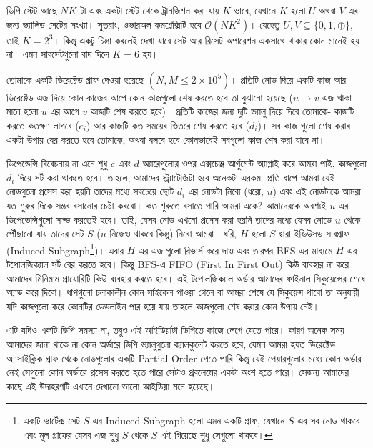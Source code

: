 \begin{solution}
ডিপি স্টেট আছে $NK$ টা এবং একটা স্টেট থেকে ট্রানজিশন করা যায় $K$ ভাবে, যেখানে $K$ হলো $U$ অথবা $V$ এর জন্য ভ্যালিড সেটের সংখ্যা। সুতরাং, ওভারঅল কমপ্লেক্সিটি হবে $\mathcal{O}(NK^2)$। যেহেতু $U, V \subseteq \{0, 1, \oplus\}$, তাই $K = 2^3$। কিন্তু একটু চিন্তা করলেই দেখা যাবে সেট আর রিসেট অপারেশন একসাথে থাকার কোন মানেই হয় না। এমন সাবসেটগুলো বাদ দিলে $K=6$ হয়।
\end{solution}

\begin{example}
তোমাকে একটি ডিরেক্টেড গ্রাফ দেওয়া হয়েছে $(N, M \le 2\times 10^5)$। প্রতিটি নোড দিয়ে একটি কাজ আর ডিরেক্টেড এজ দিয়ে কোন কাজের আগে কোন কাজগুলো শেষ করতে হবে তা বুঝানো হয়েছে ($u \rightarrow v$ এজ থাকা মানে হলো $u$ এর আগে $v$ কাজটি শেষ করতে হবে)। প্রতিটি কাজের জন্য দুটি ভ্যালু দিয়ে দিবে তোমাকে- কাজটি করতে কতক্ষণ লাগবে ($c_i$) আর কাজটি কত সময়ের ভিতরে শেষ করতে হবে ($d_i$)। সব কাজ গুলো শেষ করার একটা উপায় বের করতে হবে তোমাকে, অথবা বলবে হবে কোনভাবেই সবগুলো কাজ শেষ করা যাবে না।
\end{example}
\begin{solution}
ডিপেন্ডেন্সি বিবেচনায় না এনে শুধু $c$ এবং $d$ অ্যারেগুলোর ওপর এক্সচেঞ্জ আর্গুমেন্ট অ্যাপ্লাই করে আমরা পাই, কাজগুলো $d_i$ দিয়ে সর্ট করা থাকতে হবে। তাহলে, আমাদের স্ট্র্যাটেজিটা হবে অনেকটা এরকম- 	প্রতি ধাপে আমরা যেই নোডগুলো প্রসেস করা হয়নি তাদের মধ্যে সবচেয়ে ছোট $d_i$ এর নোডটা নিবো (ধরো, $u$) এবং এই নোডটাকে আমরা যত শুরুর দিকে সম্ভব বসানোর চেষ্টা করবো। কত শুরুতে বসাতে পারি আমরা একে? আমাদেরকে অবশ্যই $u$ এর ডিপেন্ডেন্সিগুলো সল্ভ করতেই হবে। তাই, যেসব নোড এখনো প্রসেস করা হয়নি তাদের মধ্যে যেসব নোডে $u$ থেকে পৌঁছানো যায় তাদের সেট $S$ ($u$ নিজেও থাকবে কিন্তু) নিবো আমরা। 	ধরি, $H$ হলো $S$ দ্বারা ইন্ডিউসড সাবগ্রাফ (Induced Subgraph\footnote{একটি ভার্টেক্স সেট $S$ এর Induced Subgraph হলো এমন একটি গ্রাফ, যেখানে $S$ এর সব নোড থাকবে এবং মূল গ্রাফের যেসব এজ শুধু $S$ থেকে $S$ এই গিয়েছে শুধু সেগুলো থাকবে।})। এবার $H$ এর এজ গুলো রিভার্স করে দাও এবং তারপর BFS এর মাধ্যমে $H$ এর টপোলজিক্যাল সর্ট বের করতে হবে। কিন্তু BFS-এ FIFO (First In First Out) কিউ ব্যবহার না করে আমাদের মিনিমাম প্রায়োরিটি কিউ ব্যবহার করতে হবে। এই টপোলজিক্যাল অর্ডার আমাদের ফাইনাল সিকুয়েন্সের শেষে অ্যাড করে দিবো। ধাপগুলো চলাকালীন কোন সাইকেল পাওয়া গেলে বা আমরা শেষে যে সিকুয়েন্স পাবো তা অনুযায়ী যদি কাজগুলো করে কোনটির ডেডলাইন পার হয়ে যায় তাহলে কাজগুলো শেষ করার কোন উপায় নেই।
\end{solution}

এটি যদিও একটি ডিপি সমস্যা না, তবুও এই আইডিয়াটা ডিপিতে কাজে লেগে যেতে পারে। কারণ অনেক সময় আমাদের জানা থাকে না কোন অর্ডারে ডিপি ভ্যালুগুলো ক্যালকুলেট করতে হবে, যেমন আমরা হয়ত ডিরেক্টেড অ্যাসাইক্লিক গ্রাফ থেকে নোডগুলোর একটি Partial Order পেতে পারি কিন্তু যেই পেয়ারগুলোর মধ্যে কোন অর্ডার নেই সেগুলো কোন অর্ডারে প্রসেস করতে হতে পারে সেটাও প্রবলেমের একটা অংশ হতে পারে। সেজন্য আমাদের কাছে এই উদাহরণটি এখানে দেখানো ভালো আইডিয়া মনে হয়েছে।


